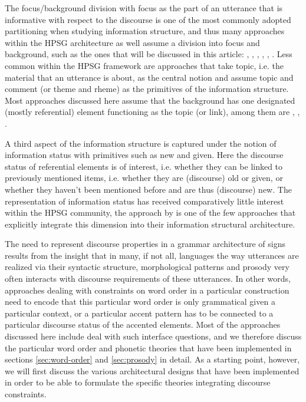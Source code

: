 \documentclass[output=paper]{langsci/langscibook}
\begin{document}
The focus/background division with focus as the part of an utterance
that is informative with respect to the discourse is one of the most
commonly adopted partitioning when studying information structure, and
thus many approaches within the HPSG architecture as well assume a
division into focus and background, such as the ones that will be discussed in this
article: \cite{EV96a}, \cite{deKuthy2002a}, \cite{Webelhuth2007a-u},
\cite{song-bender:2012}, \cite{Paggio2009a-u},
\cite{Bildhauer2008a}. Less common within the HPSG framework are
approaches that take topic, i.e. the material that an utterance is
about, as the central notion and assume topic and comment (or theme
and rheme) as the primitives of the information structure. Most
approaches discussed here assume that the background has one
designated (mostly referential) element functioning as the topic (or
link), among them are \cite{EV96a}, \cite{deKuthy2002a},
\cite{Paggio2009a-u}.

A third aspect of the information structure is captured under the
notion of information status with primitives such as new and
given. Here the discourse status of referential elements is of
interest, i.e. whether they can be linked to previously mentioned
items, i.e. whether they are (discourse) old or given, or whether they
haven't been mentioned before and are thus (discourse) new. The
representation of information status has received comparatively little
interest within the HPSG community, the approach by
\cite{DeKuthy.Meurers-11} is one of the few approaches that
explicitly integrate this dimension into their information structural
architecture.

The need to represent discourse properties in a grammar architecture
of signs results from the insight that in many, if not all, languages
the way utterances are realized via their syntactic structure,
morphological patterns and prosody very often interacts with discourse
requirements of these utterances. In other words, approaches dealing
with constraints on word order in a particular construction need to
encode that this particular word order is only grammatical given a
particular context, or a particular accent pattern has to be connected
to a particular discourse status of the accented elements.
Most of the approaches discussed here include deal with such interface
questions, and we therefore discuss the particular word order and
phonetic theories that have been implemented in sections \ref{sec:word-order}
and \ref{sec:prosody} in detail. As a starting point, however, we will first
discuss the various architectural designs that have been implemented in
order to be able to formulate the specific theories integrating
discourse constraints.
\end{document}

